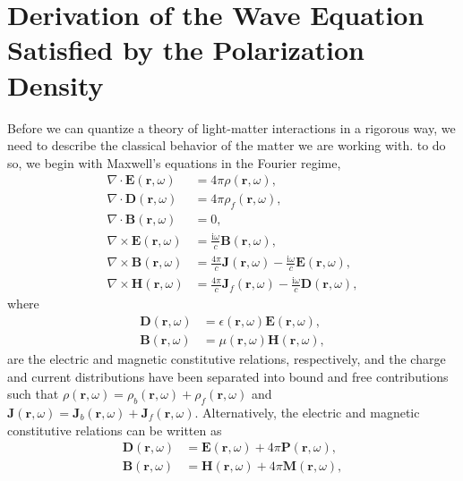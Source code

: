 
\section{Derivation of the Wave Equation Satisfied by the Polarization Density}\label{app:polarizationWaveEquation}

Before we can quantize a theory of light-matter interactions in a rigorous way, we need to describe the classical behavior of the matter we are working with. to do so, we begin with Maxwell's equations in the Fourier regime,
\begin{equation}
\begin{split}
\nabla\cdot\mathbf{E}(\mathbf{r},\omega) &= 4\pi\rho(\mathbf{r},\omega),\\
\nabla\cdot\mathbf{D}(\mathbf{r},\omega) &= 4\pi\rho_f(\mathbf{r},\omega),\\
\nabla\cdot\mathbf{B}(\mathbf{r},\omega) &= 0,\\
\nabla\times\mathbf{E}(\mathbf{r},\omega) &= \frac{\mathrm{i}\omega}{c}\mathbf{B}(\mathbf{r},\omega),\\
\nabla\times\mathbf{B}(\mathbf{r},\omega) &= \frac{4\pi}{c}\mathbf{J}(\mathbf{r},\omega) - \frac{\mathrm{i}\omega}{c}\mathbf{E}(\mathbf{r},\omega),\\
\nabla\times\mathbf{H}(\mathbf{r},\omega) &= \frac{4\pi}{c}\mathbf{J}_f(\mathbf{r},\omega) - \frac{\mathrm{i}\omega}{c}\mathbf{D}(\mathbf{r},\omega),
\end{split}
\end{equation}
where
\begin{equation}
\begin{split}
\mathbf{D}(\mathbf{r},\omega) &= \epsilon(\mathbf{r},\omega)\mathbf{E}(\mathbf{r},\omega),\\
\mathbf{B}(\mathbf{r},\omega) &= \mu(\mathbf{r},\omega)\mathbf{H}(\mathbf{r},\omega),
\end{split}
\end{equation}
are the electric and magnetic constitutive relations, respectively, and the charge and current distributions have been separated into bound and free contributions such that $\rho(\mathbf{r},\omega) = \rho_b(\mathbf{r},\omega) + \rho_f(\mathbf{r},\omega)$ and $\mathbf{J}(\mathbf{r},\omega) = \mathbf{J}_b(\mathbf{r},\omega) + \mathbf{J}_f(\mathbf{r},\omega)$. Alternatively, the electric and magnetic constitutive relations can be written as
\begin{equation}
\begin{split}
\mathbf{D}(\mathbf{r},\omega) &= \mathbf{E}(\mathbf{r},\omega) + 4\pi\mathbf{P}(\mathbf{r},\omega),\\
\mathbf{B}(\mathbf{r},\omega) &= \mathbf{H}(\mathbf{r},\omega) + 4\pi\mathbf{M}(\mathbf{r},\omega),
\end{split}
\end{equation}
